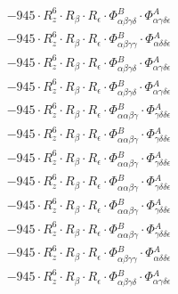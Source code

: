 \documentclass{article}
\begin{document}
\begin{subequations}
\begin{gather}
\begin{array}{c}
 \\[0.2em] 		 - 945 \cdot R_{z}^{6} \cdot R_{\beta{}} \cdot R_{\epsilon{}} \cdot \Phi{}^{B}_{\alpha{}\beta{}\gamma{}\delta{}} \cdot \Phi{}^{A}_{\alpha{}\gamma{}\delta{}\epsilon{}} 
 \\[0.2em] 		 - 945 \cdot R_{z}^{6} \cdot R_{\beta{}} \cdot R_{\epsilon{}} \cdot \Phi{}^{B}_{\alpha{}\beta{}\gamma{}\gamma{}} \cdot \Phi{}^{A}_{\alpha{}\delta{}\delta{}\epsilon{}} 
 \\[0.2em] 		 - 945 \cdot R_{z}^{6} \cdot R_{\beta{}} \cdot R_{\epsilon{}} \cdot \Phi{}^{B}_{\alpha{}\beta{}\gamma{}\delta{}} \cdot \Phi{}^{A}_{\alpha{}\gamma{}\delta{}\epsilon{}} 
 \\[0.2em] 		 - 945 \cdot R_{z}^{6} \cdot R_{\beta{}} \cdot R_{\epsilon{}} \cdot \Phi{}^{B}_{\alpha{}\beta{}\gamma{}\delta{}} \cdot \Phi{}^{A}_{\alpha{}\gamma{}\delta{}\epsilon{}} 
 \\[0.2em] 		 - 945 \cdot R_{z}^{6} \cdot R_{\beta{}} \cdot R_{\epsilon{}} \cdot \Phi{}^{B}_{\alpha{}\alpha{}\beta{}\gamma{}} \cdot \Phi{}^{A}_{\gamma{}\delta{}\delta{}\epsilon{}} 
 \\[0.2em] 		 - 945 \cdot R_{z}^{6} \cdot R_{\beta{}} \cdot R_{\epsilon{}} \cdot \Phi{}^{B}_{\alpha{}\alpha{}\beta{}\gamma{}} \cdot \Phi{}^{A}_{\gamma{}\delta{}\delta{}\epsilon{}} 
 \\[0.2em] 		 - 945 \cdot R_{z}^{6} \cdot R_{\beta{}} \cdot R_{\epsilon{}} \cdot \Phi{}^{B}_{\alpha{}\alpha{}\beta{}\gamma{}} \cdot \Phi{}^{A}_{\gamma{}\delta{}\delta{}\epsilon{}} 
 \\[0.2em] 		 - 945 \cdot R_{z}^{6} \cdot R_{\beta{}} \cdot R_{\epsilon{}} \cdot \Phi{}^{B}_{\alpha{}\alpha{}\beta{}\gamma{}} \cdot \Phi{}^{A}_{\gamma{}\delta{}\delta{}\epsilon{}} 
 \\[0.2em] 		 - 945 \cdot R_{z}^{6} \cdot R_{\beta{}} \cdot R_{\epsilon{}} \cdot \Phi{}^{B}_{\alpha{}\alpha{}\beta{}\gamma{}} \cdot \Phi{}^{A}_{\gamma{}\delta{}\delta{}\epsilon{}} 
 \\[0.2em] 		 - 945 \cdot R_{z}^{6} \cdot R_{\beta{}} \cdot R_{\epsilon{}} \cdot \Phi{}^{B}_{\alpha{}\alpha{}\beta{}\gamma{}} \cdot \Phi{}^{A}_{\gamma{}\delta{}\delta{}\epsilon{}} 
 \\[0.2em] 		 - 945 \cdot R_{z}^{6} \cdot R_{\beta{}} \cdot R_{\epsilon{}} \cdot \Phi{}^{B}_{\alpha{}\beta{}\gamma{}\gamma{}} \cdot \Phi{}^{A}_{\alpha{}\delta{}\delta{}\epsilon{}} 
 \\[0.2em] 		 - 945 \cdot R_{z}^{6} \cdot R_{\beta{}} \cdot R_{\epsilon{}} \cdot \Phi{}^{B}_{\alpha{}\beta{}\gamma{}\delta{}} \cdot \Phi{}^{A}_{\alpha{}\gamma{}\delta{}\epsilon{}} 

\end{array}
\end{gather}
\end{subequations}
\end{document}
